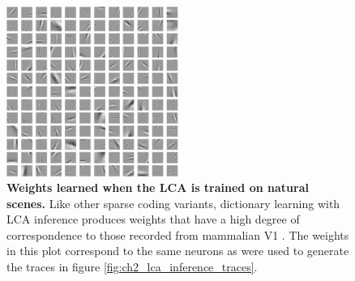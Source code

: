 \begin{figure}[ht]
    \centering
    \includegraphics[width=0.5\textwidth]{figures/lca_inference_weights.png}
    \caption{\textbf{Weights learned when the LCA is trained on natural scenes.} Like other sparse coding variants, dictionary learning with LCA inference produces weights that have a high degree of correspondence to those recorded from mammalian V1 \parencite{zylberberg2011sparse, rehn2007network, olshausen1997sparse}. The weights in this plot correspond to the same neurons as were used to generate the traces in figure \ref{fig:ch2_lca_inference_traces}.}
    \label{fig:ch2_lca_inference_weights}
\end{figure}

